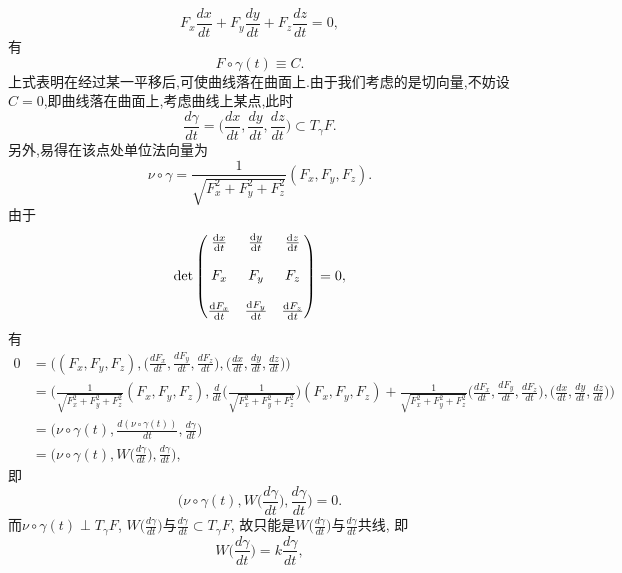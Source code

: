 \begin{itemize}
\begin{proofc}
\begin{equation}
            F_{x}\frac{dx}{dt}+F_{y}\frac{dy}{dt}+F_{z}\frac{dz}{dt}=0,
        \end{equation}
        有
        $$
            F\circ\gamma(t)\equiv C.
        $$
        上式表明在经过某一平移后,可使曲线落在曲面上.由于我们考虑的是切向量,不妨设$C=0$,即曲线落在曲面上,考虑曲线上某点,此时
        $$
            \frac{d\gamma}{dt}=\Big(\frac{dx}{dt},\frac{dy}{dt},\frac{dz}{dt}\Big)\subset T_{\gamma}F.
        $$
        另外,易得在该点处单位法向量为
        $$
            \nu\circ\gamma=\frac{1}{\sqrt{F_{x}^{2}+F_{y}^{2}+F_{z}^{2}}}(F_{x},F_{y},F_{z}).
        $$
        由于
        \begin{equation}
            \det\begin{pmatrix}
               \frac{{\rm d}x}{{\rm d}t}&\frac{{\rm d}y}{{\rm d}t}&\frac{{\rm d}z}{{\rm d}t}\\
               & & \\F_x&F_y&F_z\\ & & \\
                \frac{{\rm d}F_x}{{\rm d}t}&\frac{{\rm d}F_y}{{\rm d}t}&\frac{{\rm d}F_z}{{\rm d}t}
            \end{pmatrix}=0,
        \end{equation}
        有
        \begin{align*}
            0&=\Big((F_{x},F_{y},F_{z}),\Big(\frac{dF_{x}}{dt},\frac{dF_{y}}{dt},\frac{dF_{z}}{dt}\Big),\Big(\frac{dx}{dt},\frac{dy}{dt},\frac{dz}{dt}\Big)\Big)\\
            &=\Bigg(\frac{1}{\sqrt{F_{x}^{2}+F_{y}^{2}+F_{z}^{2}}}(F_{x},F_{y},F_{z}),\frac{d}{dt}\Big(\frac{1}{\sqrt{F_{x}^{2}+F_{y}^{2}+F_{z}^{2}}}\Big)(F_{x},F_{y},F_{z})+\frac{1}{\sqrt{F_{x}^{2}+F_{y}^{2}+F_{z}^{2}}}\Big(\frac{dF_{x}}{dt},\frac{dF_{y}}{dt},\frac{dF_{z}}{dt}\Big),\Big(\frac{dx}{dt},\frac{dy}{dt},\frac{dz}{dt}\Big)\Bigg)\\
            &=\Big(\nu\circ\gamma(t),\frac{d(\nu\circ\gamma(t))}{dt},\frac{d\gamma}{dt}\Big)\\
            &=\Big(\nu\circ\gamma(t),W\Big(\frac{d\gamma}{dt}\Big),\frac{d\gamma}{dt}\Big),
        \end{align*}
        即
        $$
            \Big(\nu\circ\gamma(t),W\Big(\frac{d\gamma}{dt}\Big),\frac{d\gamma}{dt}\Big)=0.
        $$
        而$\nu\circ\gamma(t)\perp T_{\gamma}F$, $W\big(\frac{d\gamma}{dt}\big)$与$\frac{d\gamma}{dt}\subset T_{\gamma}F$, 
        故只能是$W\big(\frac{d\gamma}{dt}\big)$与$\frac{d\gamma}{dt}$共线, 即
        $$
            W\Big(\frac{d\gamma}{dt}\Big)=k\frac{d\gamma}{dt},
$$
\end{proofc}
\end{itemize}
